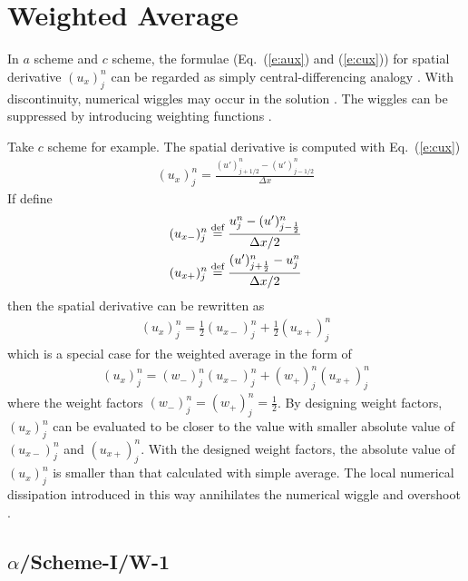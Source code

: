 \documentclass{turgon}
\begin{document}
\section{Weighted Average}
\label{s:weighted_average}

In $a$ scheme and $c$ scheme, the formulae (Eq.~(\ref{e:aux}) and
(\ref{e:cux})) for spatial derivative $(u_x)_j^n$ can be regarded as simply
central-differencing analogy \citep{chang_method_1995,
chang_multi-dimensional_2003}.  With discontinuity, numerical wiggles may occur
in the solution \citep{chang_multi-dimensional_2003}.  The wiggles can be
suppressed by introducing weighting functions \citep{chang_method_1995,
chang_multi-dimensional_2003}.

Take $c$ scheme for example.  The spatial derivative is computed with
Eq.~(\ref{e:cux})
\begin{align*}
  (u_x)_j^n = \frac{(u')_{j+1/2}^n - (u')_{j-1/2}^n}{\Delta x}
\end{align*}
If define
\begin{align}
  (u_{x-})_j^n &\defeq
    \frac{u_j^n - (u')_{j-\frac{1}{2}}^n}{\Delta x/2}
  \label{e:ux-} \\
  (u_{x+})_j^n &\defeq
    \frac{(u')_{j+\frac{1}{2}}^n - u_j^n}{\Delta x/2}
  \label{e:ux+}
\end{align}
then the spatial derivative can be rewritten as
\begin{align*}
  (u_x)_j^n = \frac{1}{2}(u_{x-})_j^n + \frac{1}{2}(u_{x+})_j^n
\end{align*}
which is a special case for the weighted average in the form of
\begin{align}
  (u_x)_j^n = (w_-)_j^n(u_{x-})_j^n + (w_+)_j^n(u_{x+})_j^n
  \label{e:weighting}
\end{align}
where the weight factors $(w_-)_j^n=(w_+)_j^n=\frac{1}{2}$.  By designing
weight factors, $(u_x)_j^n$ can be evaluated to be closer to the value with
smaller absolute value of $(u_{x-})_j^n$ and $(u_{x+})_j^n$.  With the designed
weight factors, the absolute value of $(u_x)_j^n$ is smaller than that
calculated with simple average.  The local numerical dissipation introduced in
this way annihilates the numerical wiggle and
overshoot \citep{chang_multi-dimensional_2003}.

\subsection{$\alpha$/Scheme-I/W-1}
\end{document}
